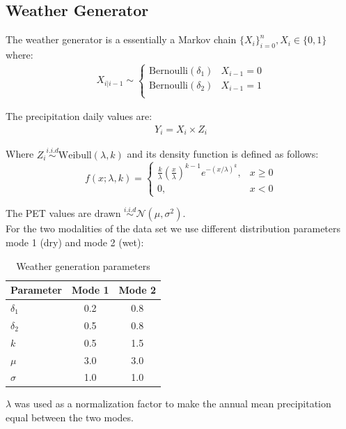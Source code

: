\documentclass[12pt]{report}
\begin{document}
\subsection{Weather Generator}
The weather generator is a essentially a Markov chain $\{X_i\}_{i=0}^n, X_i \in \{0,1\}$ where:
\begin{align*}
	X_{i|i-1} \sim \begin{cases}
		\text{Bernoulli}(\delta_1) & X_{i-1} = 0\\
		\text{Bernoulli}(\delta_2) & X_{i-1} = 1\\
	\end{cases} 
\end{align*}

The precipitation daily values are:
\begin{align*}
	Y_i = X_i \times Z_i
\end{align*} 

Where $Z_i \overset{i.i.d}{\sim} \text{Weibull}(\lambda, k)$ and its density function is defined as follows: 
\begin{equation*}
	f(x; \lambda, k) = \begin{cases}
		\frac{k}{\lambda} \left(\frac{x}{\lambda}\right)^{k-1} e^{-(x/\lambda)^k}, & x \geq 0 \\
		0, & x < 0
	\end{cases}
\end{equation*} 

The PET values are drawn $\overset{i.i.d}{\sim} \mathcal{N}(\mu, \sigma^2)$.\\


For the two modalities of the data set we use different distribution parameters  mode 1 (dry) and mode 2 (wet):
\begin{table}[ht]
	\centering
	\caption{Weather generation parameters}
	\begin{tabular}{lcc}
		\toprule
		\textbf{Parameter} & \textbf{Mode 1} & \textbf{Mode 2} \\
		\midrule
		$\delta_1$ & 0.2 & 0.8 \\
		$\delta_2$ & 0.5 & 0.8 \\
		$k$ & 0.5 & 1.5 \\
		$\mu$ & 3.0 & 3.0 \\
		$\sigma$ & 1.0 & 1.0 \\
		\bottomrule
	\end{tabular}
\end{table}

$\lambda$ was used as a normalization factor to make the annual mean precipitation equal between the two modes. 
\end{document}
